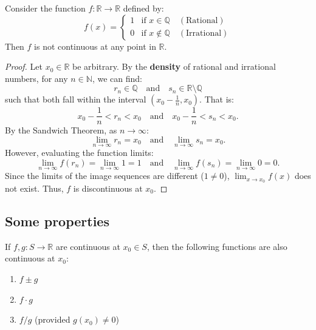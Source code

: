 \documentclass[
	UTF-8,
	11pt, %
	a4paper, %
]{LegrandOrangeBook}
\begin{document}
    \begin{example}
    Consider the function $f: \mathbb{R} \to \mathbb{R}$ defined by:
    \[
    f(x) = \begin{cases} 
    1 & \text{if } x \in \mathbb{Q} \quad (\text{Rational}) \\
    0 & \text{if } x \notin \mathbb{Q} \quad (\text{Irrational})
    \end{cases}
    \]
    Then $f$ is not continuous at any point in $\mathbb{R}$.

    \begin{proof}
    Let $x_0 \in \mathbb{R}$ be arbitrary.
    By the \textbf{density} of rational and irrational numbers, for any $n \in \mathbb{N}$, we can find:
    \[ r_n \in \mathbb{Q} \quad \text{and} \quad s_n \in \mathbb{R} \setminus \mathbb{Q} \]
    such that both fall within the interval $(x_0 - \frac{1}{n}, x_0)$. That is:
    \[ x_0 - \frac{1}{n} < r_n < x_0 \quad \text{and} \quad x_0 - \frac{1}{n} < s_n < x_0. \]
    By the Sandwich Theorem, as $n \to \infty$:
    \[ \lim_{n \to \infty} r_n = x_0 \quad \text{and} \quad \lim_{n \to \infty} s_n = x_0. \]
    However, evaluating the function limits:
    \[ \lim_{n \to \infty} f(r_n) = \lim_{n \to \infty} 1 = 1 \quad \text{and} \quad \lim_{n \to \infty} f(s_n) = \lim_{n \to \infty} 0 = 0. \]
    Since the limits of the image sequences are different ($1 \neq 0$), $\lim_{x \to x_0} f(x)$ does not exist. Thus, $f$ is discontinuous at $x_0$.
    \end{proof}
    \end{example}

    \newpage

    \subsection{Some properties}

    \begin{theorem}
    If $f, g: S \to \mathbb{R}$ are continuous at $x_0 \in S$, then the following functions are also continuous at $x_0$:
    \begin{enumerate}
        \item $f \pm g$
        \item $f \cdot g$
        \item $f / g$ \quad (provided $g(x_0) \neq 0$)
    \end{enumerate}
    \end{theorem}
\end{document}
